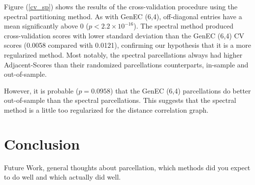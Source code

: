 Figure (\ref{cv_sp}) shows the results of the cross-validation procedure
using the spectral partitioning method. As with GenEC (6,4),
off-diagonal entries have a mean significantly above 0
($p < 2.2 \times 10^{-16}$). The spectral method produced
cross-validation scores with lower standard deviation than the GenEC
(6,4) CV scores (0.0058 compared with 0.0121), confirming our hypothesis
that it is a more regularized method. Most notably, the spectral
parcellations always had higher Adjacent-Scores than their randomized
parcellations counterparts, in-sample and out-of-sample.

However, it is probable ($p = 0.0958$) that the GenEC (6,4)
parcellations do better out-of-sample than the spectral parcellations.
This suggests that the spectral method is a little too regularized for
the distance correlation graph.

\section{Conclusion}

Future Work, general thoughts about parcellation, which methods did you
expect to do well and which actually did well.
